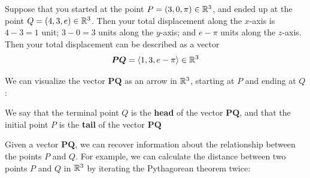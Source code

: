 \begin{example}
Suppose that you started at the point $P = (3, 0, \pi) \in \mathbb{R}^3$, and ended up at the point $Q = (4, 3, e) \in \mathbb{R}^3$.  Then your total displacement along the $x$-axis is $4-3=1$ unit; $3-0=3$ units along the $y$-axis; and $e-\pi$ units along the $z$-axis.  Then your total displacement can be described as a vector
$$\bm{PQ} = \langle 1, 3, e-\pi \rangle \in \mathbb{R}^3$$

We can visualize the vector $\bm{PQ}$ as an arrow in $\mathbb{R}^3$, starting at $P$ and ending at $Q$:

 \begin{center}
        \end{center}

We say that the terminal point $Q$ is the \textbf{head} of the vector $\bm{PQ}$, and that the initial point $P$ is the \textbf{tail} of the vector $\bm{PQ}$

\end{example}


Given a vector $\bm{PQ}$, we can recover information about the relationship between the points $P$ and $Q$.  For example, we can calculate the distance between two points $P$ and $Q$ in $\mathbb{R}^3$ by iterating the Pythagorean theorem twice:

